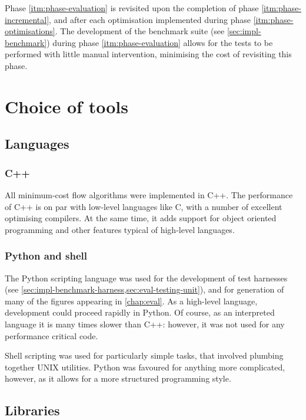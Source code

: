 Phase \ref{itm:phase-evaluation} is revisited upon the completion of phase \ref{itm:phase-incremental}, and after each optimisation implemented during phase \ref{itm:phase-optimisations}. The development of the benchmark suite (see \ref{sec:impl-benchmark}) during phase \ref{itm:phase-evaluation} allows for the tests to be performed with little manual intervention, minimising the cost of revisiting this phase.

\section{Choice of tools}

\subsection{Languages} 

\subsubsection{C++}
All minimum-cost flow algorithms were implemented in C++. The performance of C++ is on par with low-level languages like C, with a number of excellent optimising compilers\footnotemark. At the same time, it adds support for object oriented programming and other features typical of high-level languages.

\subsubsection{Python and shell}
The Python scripting language was used for the development of test harnesses (see \cref{sec:impl-benchmark-harness,sec:eval-testing-unit}), and for generation of many of the figures appearing in \cref{chap:eval}. As a high-level language, development could proceed rapidly in Python. Of course, as an interpreted language it is many times slower than C++: however, it was not used for any performance critical code.

Shell scripting was used for particularly simple tasks, that involved plumbing together UNIX utilities. Python was favoured for anything more complicated, however, as it allows for a more structured programming style.

\subsection{Libraries} \label{sec:prep-tools-libraries}

